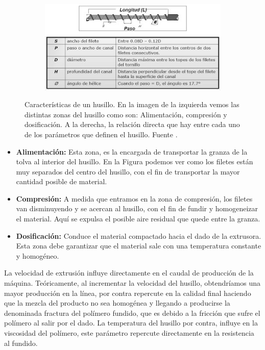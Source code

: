 \begin{itemize}
\begin{figure}[!ht]
            \begin{subfigure}[b]{0.7\textwidth}
                    \centering
                \includegraphics[width=\textwidth]{images/husillo2.jpg}
                \label{fig:estado_husillo2}
            \end{subfigure}
            \caption[Características de un husillo.]{Características de un husillo. En la imagen de la izquierda vemos las distintas zonas del husillo como son: Alimentación, compresión y dosificación. A la derecha, la relación directa que hay entre cada uno de los parámetros que definen el husillo. Fuente  \cite{parametroshusillos}.}
            \label{fig:estado_husillo}
        \end{figure}
        \begin{itemize}
                \item \textbf{Alimentación:} Esta zona, es la encargada de transportar la granza de la tolva al interior del husillo. En la Figura podemos ver como los filetes están muy separados del centro del husillo, con el fin de transportar la mayor cantidad posible de material.
                \item \textbf{Compresión:} A medida que entramos en la zona de compresión, los filetes van disminuyendo y se acercan al husillo, con el fin de fundir y homogeneizar el material. Aquí se expulsa el posible aire residual que quede entre la granza.
                \item \textbf{Dosificación:} Conduce el material compactado hacia el dado de la extrusora. Esta zona debe garantizar que el material sale con una temperatura constante y homogéneo.
        \end{itemize}
\end{itemize}

La velocidad de extrusión influye directamente en el caudal de producción de la máquina. Teóricamente, al incrementar la velocidad del husillo, obtendríamos una mayor producción en la línea, por contra repercute en la calidad final haciendo que la mezcla del producto no sea homogénea y llegando a producirse la denominada fractura del polímero fundido, que es debido a la fricción que sufre el polímero al salir por el dado. La temperatura del husillo por contra, influye en la viscosidad del polímero, este parámetro repercute directamente en la resistencia al fundido.\\


